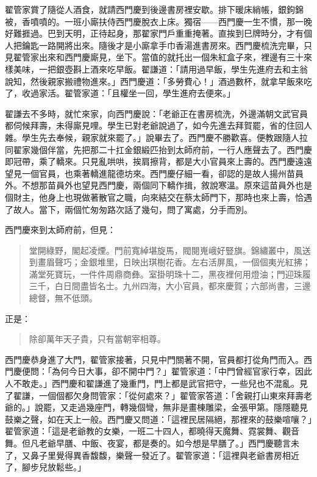 翟管家賞了隨從人酒食，就請西門慶到後邊書房裡安歇。排下暖床綃帳，銀鉤錦被，香噴噴的。一班小廝扶侍西門慶脫衣上床。獨宿——西門慶一生不慣，那一晚好難捱過。巴到天明，正待起身，那翟家門戶重重掩著。直挨到巳牌時分，才有個人把鑰匙一路開將出來。隨後才是小廝拿手巾香湯進書房來。西門慶梳洗完畢，只見翟管家出來和西門慶廝見，坐下。當值的就托出一個朱紅盒子來，裡邊有三十來樣美味，一把銀壺斟上酒來吃早飯。翟謙道：「請用過早飯，學生先進府去和主翁說知，然後親家搬禮物進來。」西門慶道：「多勞費心！」酒過數杯，就拿早飯來吃了，收過家活。翟管家道：「且權坐一回，學生進府去便來。」

翟謙去不多時，就忙來家，向西門慶說：「老爺正在書房梳洗，外邊滿朝文武官員都伺候拜壽，未得廝見哩。學生已對老爺說過了，如今先進去拜賀罷，省的住回人雜。學生先去奉候，親家就來罷了。」說畢去了。西門慶不勝歡喜。便教跟隨人拉同翟家幾個伴當，先把那二十扛金銀緞匹抬到太師府前，一行人應聲去了。西門慶即冠帶，乘了轎來。只見亂哄哄，挨肩擦背，都是大小官員來上壽的。西門慶遠遠望見一個官員，也乘著轎進龍德坊來。西門慶仔細一看，卻認的是故人揚州苗員外。不想那苗員外也望見西門慶，兩個同下轎作揖，敘說寒溫。原來這苗員外也是個財主，他身上也現做著散官之職，向來結交在蔡太師門下，那時也來上壽，恰遇了故人。當下，兩個忙匆匆路次話了幾句，問了寓處，分手而別。

西門慶來到太師府前，但見：
\begin{quote}
堂開綠野，閣起凌煙。門前寬綽堪旋馬，閥閱嵬峨好豎旗。錦繡叢中，風送到畫眉聲巧；金銀堆里，日映出琪樹花香。左右活屏風，一個個夷光紅拂；滿堂死寶玩，一件件周鼎商彝。室掛明珠十二，黑夜裡何用燈油；門迎珠履三千，白日間盡皆名士。九州四海，大小官員，都來慶賀；六部尚書，三邊總督，無不低頭。
\end{quote}
正是：
\begin{quote}
除卻萬年天子貴，只有當朝宰相尊。
\end{quote}

西門慶恭身進了大門，翟管家接著，只見中門關著不開，官員都打從角門而入。西門慶便問：「為何今日大事，卻不開中門？」翟管家道：「中門曾經官家行幸，因此人不敢走。」西門慶和翟謙進了幾重門，門上都是武官把守，一些兒也不混亂。見了翟謙，一個個都欠身問管家：「從何處來？」翟管家答道：「舍親打山東來拜壽老爺的。」說罷，又走過幾座門，轉幾個彎，無非是畫棟雕梁，金張甲第。隱隱聽見鼓樂之聲，如在天上一般。西門慶又問道：「這裡民居隔絕，那裡來的鼓樂喧嚷？」翟管家道：「這是老爺教的女樂，一班二十四人，都曉得天魔舞、霓裳舞、觀音舞。但凡老爺早膳、中飯、夜宴，都是奏的。如今想是早膳了。」西門慶聽言未了，又鼻子里覺得異香馥馥，樂聲一發近了。翟管家道：「這裡與老爺書房相近了，腳步兒放鬆些。」

